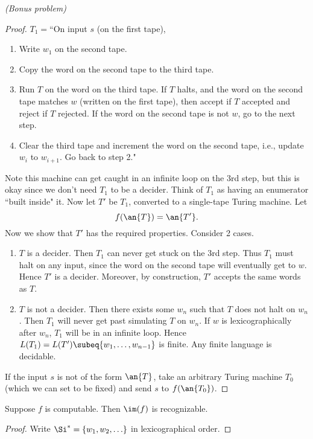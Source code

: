 \begin{problem}{\it(Bonus problem)}
\begin{proof}
$T_1=$``On input $s$ (on the first tape),
\begin{enumerate}
\item Write $w_1$ on the second tape.
\item Copy the word on the second tape to the third tape.
\item Run $T$ on the word on the third tape. If $T$ halts, and the word on the second tape matches $w$ (written on the first tape), then accept if $T$ accepted and reject if $T$ rejected. If the word on the second tape is not $w$, go to the next step.
\item Clear the third tape and increment the word on the second tape, i.e., update $w_i$ to $w_{i+1}$. Go back to step 2."
\end{enumerate}
Note this machine can get caught in an infinite loop on the 3rd step, but this is okay since we don't need $T_1$ to be a decider. Think of $T_1$ as having an enumerator ``built inside" it. Now let $T'$ be $T_1$, converted to a single-tape Turing machine. Let
\[
f(\an{T})=\an{T'}.
\]
Now we show that $T'$ has the required properties. Consider 2 cases.
\begin{enumerate}
\item
$T$ is a decider. Then $T_1$ can never get stuck on the 3rd step. Thus $T_1$ must halt on any input, since the word on the second tape will eventually get to $w$. Hence $T'$ is a decider. Moreover, by construction, $T'$ accepts the same words as $T$.
\item
$T$ is not a decider. Then there exists some $w_n$ such that $T$ does not halt on $w_n$. Then $T_1$ will never get past simulating $T$ on $w_n$. If $w$ is lexicographically after $w_n$, $T_1$ will be in an infinite loop. Hence $L(T_1)=L(T')\subeq \{w_1,\ldots, w_{n-1}\}$ is finite. Any finite language is decidable.
\end{enumerate}
If the input $s$ is not of the form $\an{T}$, take an arbitrary Turing machine $T_0$ (which we can set to be fixed) and send $s$ to $f(\an{T_0})$.
\end{proof}
\begin{lem}
Suppose $f$ is computable. Then $\im(f)$ is recognizable.
\end{lem}
\begin{proof}
Write $\Si^*=\{w_1,w_2,\ldots\}$ in lexicographical order.


\end{proof}
\end{problem}
